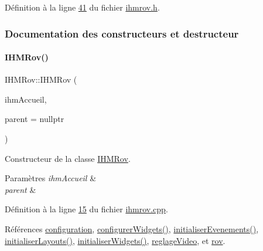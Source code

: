 Définition à la ligne \hyperlink{ihmrov_8h_source_l00041}{41} du fichier \hyperlink{ihmrov_8h_source}{ihmrov.\+h}.



\subsubsection{Documentation des constructeurs et destructeur}
\mbox{\label{class_i_h_m_rov_a403274da2bd4ca316f2f1b64a48a315b}} 
\paragraph{\texorpdfstring{I\+H\+M\+Rov()}{IHMRov()}}
{\footnotesize\ttfamily I\+H\+M\+Rov\+::\+I\+H\+M\+Rov (\begin{DoxyParamCaption}\item[{\hyperlink{class_i_h_m_accueil}{I\+H\+M\+Accueil} $\ast$}]{ihm\+Accueil,  }\item[{\hyperlink{class_q_widget}{Q\+Widget} $\ast$}]{parent = {\ttfamily nullptr} }\end{DoxyParamCaption})}



Constructeur de la classe \hyperlink{class_i_h_m_rov}{I\+H\+M\+Rov}. 


\begin{DoxyParams}{Paramètres}
{\em ihm\+Accueil} & \\
\hline
{\em parent} & \\
\hline
\end{DoxyParams}


Définition à la ligne \hyperlink{ihmrov_8cpp_source_l00015}{15} du fichier \hyperlink{ihmrov_8cpp_source}{ihmrov.\+cpp}.



Références \hyperlink{ihmrov_8h_source_l00049}{configuration}, \hyperlink{ihmrov_8cpp_source_l00050}{configurer\+Widgets()}, \hyperlink{ihmrov_8cpp_source_l00098}{initialiser\+Evenements()}, \hyperlink{ihmrov_8cpp_source_l00061}{initialiser\+Layouts()}, \hyperlink{ihmrov_8cpp_source_l00033}{initialiser\+Widgets()}, \hyperlink{ihmrov_8h_source_l00048}{reglage\+Video}, et \hyperlink{ihmrov_8h_source_l00047}{rov}.



